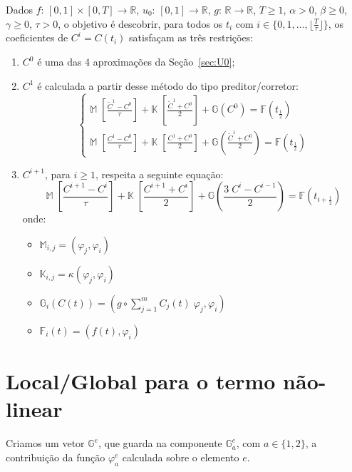 \documentclass[a4paper]{article}
\newcommand{\typ}{:\,}
\newcommand{\vphi}{\varphi}
\begin{document}
Dados
\(f \typ [0, 1] \times [0, T] \to \mathbb{R}\),
\(u_0 \typ [0, 1] \to \mathbb{R}\),
\(g \typ \mathbb{R} \to \mathbb{R}\),
\(T \ge 1\),
\(\alpha > 0\),
\(\beta \ge 0\),
\(\gamma \ge 0\),
\(\tau > 0\),
o objetivo é descobrir,
para todos os \(t_i\)
com \(i \in \{ 0, 1, \dots, \lfloor \frac{T}{\tau} \rfloor \}\),
os coeficientes de \(C^i = C(t_i)\)
satisfaçam as três restrições:
\begin{enumerate}
\item \(C^0\) é uma das 4 aproximações da Seção~\ref{sec:U0};
\item \(C^1\) é calculada a partir
    desse método do tipo preditor/corretor:
\[ \begin{cases}
    \mathbb{M} \; \left[ \frac{\tilde{C}^1 - C^0}{\tau} \right]
    + \mathbb{K} \; \left[ \frac{\tilde{C}^1 + C^0}{2} \right]
    + \mathbb{G}\left( C^0 \right)
    = \mathbb{F}\left( t_{\frac12} \right)
    \\[1ex]
    \mathbb{M} \; \left[ \frac{C^1 - C^0}{\tau} \right]
    + \mathbb{K} \; \left[ \frac{C^1 + C^0}{2} \right]
    + \mathbb{G}\left( \frac{\tilde{C}^1 + C^0}{2} \right)
    = \mathbb{F}\left( t_{\frac12} \right)
\end{cases} \]
\item \(C^{i+1}\), para \(i \ge 1\), respeita a seguinte equação:
\[
    \mathbb{M} \; \left[ \frac{C^{i+1} - C^i}{\tau} \right]
    + \mathbb{K} \; \left[ \frac{C^{i+1} + C^i}{2} \right]
    + \mathbb{G}\left( \frac{3 \; C^i - C^{i-1}}{2} \right)
    = \mathbb{F}\left( t_{i+\frac12} \right)
\]
onde:
\begin{itemize}
\item \(
    \mathbb{M}_{i, j} = (\vphi_j, \vphi_i)
\)
\item \(
    \mathbb{K}_{i, j} = \kappa(\vphi_j, \vphi_i)
\)
\item \(
    \mathbb{G}_{i}(C(t)) = (g \circ \sum_{j=1}^m{ C_j(t) \; \vphi_j }, \vphi_i)
\)
\item \(
    \mathbb{F}_i(t) = (f(t), \vphi_i)
\)
\end{itemize}
\end{enumerate}

\section{Local/Global para o termo não-linear}

Criamos um vetor \(\mathbb{G}^e\),
que guarda na componente \(\mathbb{G}^e_a\),
com \(a \in \{ 1, 2 \}\),
a contribuição da função \(\vphi^e_a\)
calculada sobre o elemento \(e\).
\end{document}
